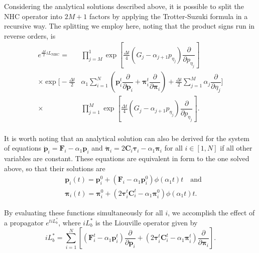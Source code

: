 \documentclass[aip,jcp,reprint,amsmath,amssymb,raggedbottom]{revtex4-1}
\newcommand{\mt}[1]{\boldsymbol{\mathbf{#1}}}           %
\newcommand{\vt}[1]{\boldsymbol{\mathbf{#1}}}           %
\newcommand{\tr}[1]{#1^t}                               %
\newcommand{\diff}[2]{\dfrac{\partial #1}{\partial #2}} %
\begin{document}
Considering the analytical solutions described above, it is possible to split the NHC operator into $2M+1$ factors by applying the Trotter-Suzuki formula in a recursive way. The splitting we employ here, noting that the product signs run in reverse orders, is
\begin{align*}
e^{\frac{\Delta t}{2} i\!L_\text{NHC}} = &\prod_{j=M}^1 \exp \left[ \frac{\Delta t}{4} (G_j - \alpha_{j+1} p_{\eta_j}) \diff{}{p_{\eta_j}} \right] \\
\times \exp \Bigg[ -\frac{\Delta t}{2} &\alpha_1 \sum_{i=1}^N \left(\tr{\vt p}_i \diff{}{\vt p_i} + \tr{\vt \pi}_i \diff{}{\vt \pi_i}\right) + \frac{\Delta t}{2} \sum_{j=1}^M \alpha_j \diff{}{\eta_j} \Bigg] \\
\times &\prod_{j=1}^M \exp \left[\frac{\Delta t}{4} (G_j - \alpha_{j+1} p_{\eta_j}) \diff{}{p_{\eta_j}} \right].\\
\end{align*}

It is worth noting that an analytical solution can also be derived for the system of equations $\dot{\vt p}_i = {\vt F}_i - \alpha_1 \vt p_i$ and $\dot{\vt \pi}_i = 2 \mt C_i \vt \tau_i - \alpha_1 \vt \pi_i$ for all $i \in [1,N]$ if all other variables are constant. These equations are equivalent in form to the one solved above, so that their solutions are
\begin{subequations}
\label{eq:solution_momenta}
\begin{align}
&{\vt p}_i(t) = {\vt p}_i^0 + \left({\vt F}_i - \alpha_1 {\vt p}_i^0 \right) \phi\left(\alpha_1 t \right) t \quad \text{and} \label{eq:solution_p} \\
&{\vt \pi}_i(t) = {\vt \pi}_i^0 + \left(2 \tr{\vt \tau}_i \tr{\mt C}_i - \alpha_1 {\vt \pi}_i^0 \right) \phi\left(\alpha_1 t \right) t. \label{eq:solution_pi}
\end{align}
\end{subequations}

By evaluating these functions simultaneously for all $i$, we accomplish the effect of a propagator $e^{t i\!L_b^\ast}$, where $i\!L_b^\ast$ is the Liouville operator given by
\[
i\!L_b^\ast = \sum_{i=1}^N \left[ \left( \tr{\vt F}_i - \alpha_1 \tr{\vt p}_i \right) \diff{}{\vt p_i} + \left(2 \tr{\vt \tau}_i \tr{\mt C}_i - \alpha_1 \tr{\vt \pi}_i \right) \diff{}{\vt \pi_i} \right].
\]
\end{document}
